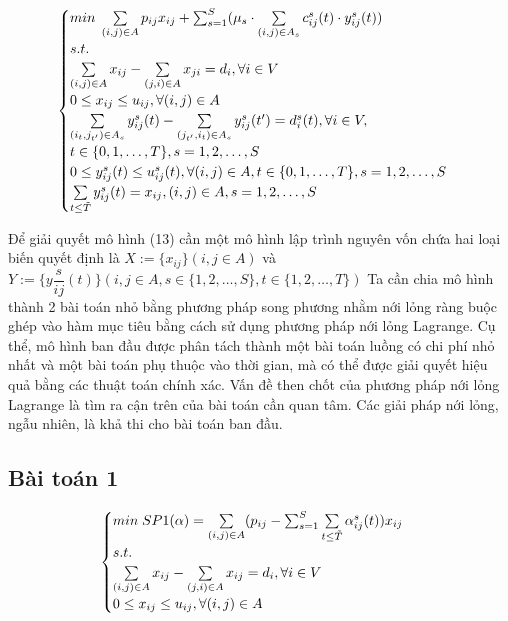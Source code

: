 \documentclass[a4paper]{article}
\begin{document}
    \begin{gather}
        \begin{cases}
            min \; \sum\limits_{(i,j) \in A} p_{ij}x_{ij} + \sum_{s=1}^{S} (\mu_s \cdot \sum\limits_{(i,j) \in A_s} c_{ij}^s(t) \cdot y_{ij}^s(t))\\
            s.t.\\
            \sum\limits_{(i,j) \in A} x_{ij} - \sum\limits_{(j,i) \in A} x_{ji} = d_i, \forall i \in V\\
            0 \leq x_{ij} \leq u_{ij}, \forall (i,j) \in A\\
            \sum\limits_{(i_t,j_{t'}) \in A_s} y_{ij}^s(t) - \sum\limits_{(j_{t'},i_t) \in A_s} y_{ij}^s(t') = d_i^s(t), \forall i \in V,\\
            t \in \{0,1, \dotsc, T \}, s = 1, 2, \dots, S\\
            0 \leq y_{ij}^s(t) \leq u_{ij}^s(t), \forall (i,j) \in A, t \in \{0,1, \dotsc, T \}, s = 1, 2, \dots, S\\
            \sum\limits_{t \leq \Tilde{T}} y_{ij}^s(t) = x_{ij}, (i,j) \in A, s = 1, 2, \dots, S\\
        \end{cases}
    \end{gather}

    Để giải quyết mô hình (13) cần một mô hình lập trình nguyên vốn chứa hai loại biến quyết định là 
    $X \mathrel{:=} \{x_{ij}\} (i,j \in A)$ và $Y \mathrel{:=} \{y\dfrac{s}{ij}(t)\}(i,j \in A, s \in \{1,2, \dotsc, S\}, t \in \{1,2, \dotsc, T\})$
    Ta cần chia mô hình thành 2 bài toán nhỏ bằng phương pháp song phương nhằm nới lỏng ràng buộc ghép vào hàm mục tiêu bằng cách sử dụng phương pháp nới lỏng Lagrange. 
    Cụ thể, mô hình ban đầu được phân tách thành một bài toán luồng có chi phí nhỏ nhất và một bài toán phụ thuộc vào thời gian, 
    mà có thể được giải quyết hiệu quả bằng các thuật toán chính xác. Vấn đề then chốt của phương pháp nới lỏng Lagrange là tìm ra cận trên của bài toán cần quan tâm. 
    Các giải pháp nới lỏng, ngẫu nhiên, là khả thi cho bài toán ban đầu. 

    \subsection{Bài toán 1}

    \begin{displaymath}
        \begin{cases}
            min \; SP1(\alpha) = \sum\limits_{(i,j) \in A} (p_{ij} - \sum_{s=1}^{S}\sum\limits_{t \leq \Tilde{T}} \alpha_{ij}^s(t))x_{ij}\\
            s.t.\\
            \sum\limits_{(i,j) \in A} x_{ij} - \sum\limits_{(j,i) \in A} x_{ij} = d_i, \forall i \in V\\
            0 \leq x_{ij} \leq u_{ij}, \forall (i,j) \in A\\
        \end{cases}
    \end{displaymath}
\end{document}
